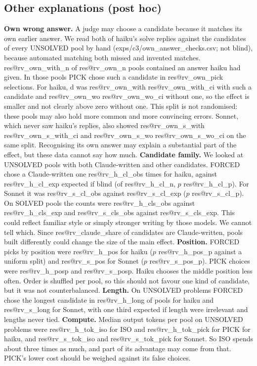 \documentclass[10pt,twocolumn]{article}
\makeatletter
\newcommand{\res}[1]{\csname res@#1\endcsname}
\makeatother
\begin{document}
\subsection{Other explanations (post hoc)}\label{sec:checks}
\textbf{Own wrong answer.} A judge may choose a candidate because it matches its own earlier answer. We read both of haiku's solve replies against the candidates of every UNSOLVED pool by hand (exps/c3/own\_answer\_checks.csv; not blind), because automated matching both missed and invented matches. \res{rv_own_with_n} of \res{rv_own_n} pools contained an answer haiku had given. In those pools PICK chose such a candidate in \res{rv_own_pick} selections. For haiku, d was \res{rv_own_with} \res{rv_own_with_ci} with such a candidate and \res{rv_own_wo} \res{rv_own_wo_ci} without one, so the effect is smaller and not clearly above zero without one. This split is not randomised: these pools may also hold more common and more convincing errors. Sonnet, which never saw haiku's replies, also showed \res{rv_own_s_with} \res{rv_own_s_with_ci} and \res{rv_own_s_wo} \res{rv_own_s_wo_ci} on the same split. Recognising its own answer may explain a substantial part of the effect, but these data cannot say how much.
\textbf{Candidate family.} We looked at UNSOLVED pools with both Claude-written and other candidates. FORCED chose a Claude-written one \res{rv_h_cl_obs} times for haiku, against \res{rv_h_cl_exp} expected if blind (of \res{rv_h_cl_n}, $p$ \res{rv_h_cl_p}). For Sonnet it was \res{rv_s_cl_obs} against \res{rv_s_cl_exp} ($p$ \res{rv_s_cl_p}). On SOLVED pools the counts were \res{rv_h_cls_obs} against \res{rv_h_cls_exp} and \res{rv_s_cls_obs} against \res{rv_s_cls_exp}. This could reflect familiar style or simply stronger writing by those models. We cannot tell which. Since \res{rv_claude_share} of candidates are Claude-written, pools built differently could change the size of the main effect.
\textbf{Position.} FORCED picks by position were \res{rv_h_pos} for haiku ($p$ \res{rv_h_pos_p} against a uniform split) and \res{rv_s_pos} for Sonnet ($p$ \res{rv_s_pos_p}). PICK choices were \res{rv_h_posp} and \res{rv_s_posp}. Haiku chooses the middle position less often. Order is shuffled per pool, so this should not favour one kind of candidate, but it was not counterbalanced.
\textbf{Length.} On UNSOLVED problems FORCED chose the longest candidate in \res{rv_h_long} of pools for haiku and \res{rv_s_long} for Sonnet, with one third expected if length were irrelevant and lengths never tied.
\textbf{Compute.} Median output tokens per pool on UNSOLVED problems were \res{rv_h_tok_iso} for ISO and \res{rv_h_tok_pick} for PICK for haiku, and \res{rv_s_tok_iso} and \res{rv_s_tok_pick} for Sonnet. So ISO spends about three times as much, and part of its advantage may come from that. PICK's lower cost should be weighed against its false choices.
\end{document}
